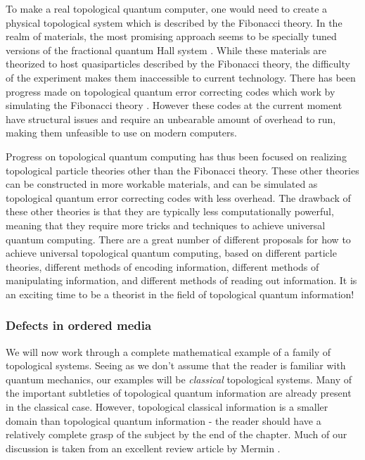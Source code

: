 To make a real topological quantum computer, one would need to create a physical topological system which is described by the Fibonacci theory. In the realm of materials, the most promising approach seems to be specially tuned versions of the fractional quantum Hall system \cite{zhu2015fractional}. While these materials are theorized to host quasiparticles described by the Fibonacci theory, the difficulty of the experiment makes them inaccessible to current technology. There has been progress made on topological quantum error correcting codes which work by simulating the Fibonacci theory \cite{schotte2022quantum, schotte2022fault, xu2024non}. However these codes at the current moment have structural issues and require an unbearable amount of overhead to run, making them unfeasible to use on modern computers.

Progress on topological quantum computing has thus been focused on realizing topological particle theories other than the Fibonacci theory. These other theories can be constructed in more workable materials, and can be simulated as topological quantum error correcting codes with less overhead. The drawback of these other theories is that they are typically less computationally powerful, meaning that they require more tricks and techniques to achieve universal quantum computing. There are a great number of different proposals for how to achieve universal topological quantum computing, based on different particle theories, different methods of encoding information, different methods of manipulating information, and different methods of reading out information. It is an exciting time to be a theorist in the field of topological quantum information!

\subsubsection{Defects in ordered media}

We will now work through a complete mathematical example of a family of topological systems. Seeing as we don't assume that the reader is familiar with quantum mechanics, our examples will be {\em classical} topological systems. Many of the important subtleties of topological quantum information are already present in the classical case. However, topological classical information is a smaller domain than topological quantum information - the reader should have a relatively complete grasp of the subject by the end of the chapter. Much of our discussion is taken from an excellent review article by Mermin \cite{mermin1979topological}.

